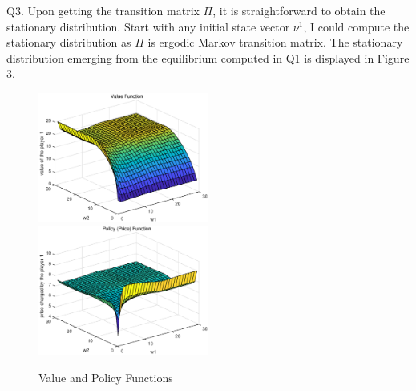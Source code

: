 \documentclass[10pt, letterpaper]{article}
\begin{document}
\noindent Q3. Upon getting the transition matrix $\Pi$, it is straightforward to obtain the stationary distribution. Start with any initial state vector $\nu^{1}$, I could compute the stationary distribution as $\Pi$ is ergodic Markov transition matrix. The stationary distribution emerging from the equilibrium computed in Q1 is displayed in Figure 3.



\begin{figure}
\centering
\includegraphics[width=0.5\textwidth]{value.eps}\\
\includegraphics[width=0.5\textwidth]{policy.eps}
\caption{Value and Policy Functions}
\end{figure}
\end{document}
